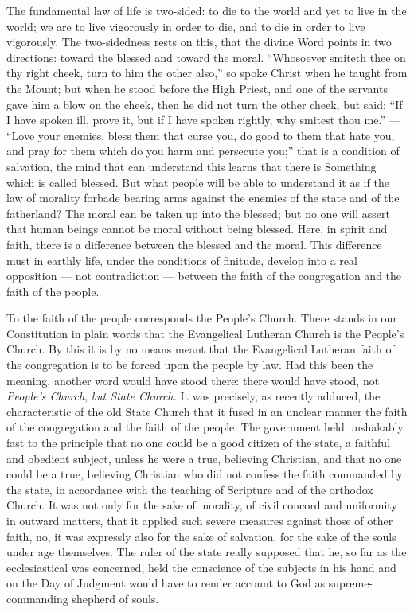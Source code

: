 \documentclass[12pt,a4paper,openany]{book}
\newcommand{\opage}[1]{\marginnote{\footnotesize\textit{[#1]}}}
\begin{document}
The fundamental law of life is two-sided: to die to the world
and yet to live in the world; we are to live vigorously in order to
die, and to die in order to live vigorously. The two-sidedness
rests on this, that the divine Word points in two directions:
toward the blessed and toward the moral. ``Whosoever
smiteth thee on thy right cheek, turn to him the other
also,'' so spoke Christ when he taught from
\setcounter{footnote}{0}%
\opage{105}the Mount; but when he stood before the High Priest, and one
of the servants gave him a blow on the cheek, then he did
not turn the other cheek, but said: ``If I have
spoken ill, prove it, but if I have spoken rightly, why
smitest thou me.'' --- ``Love your enemies, bless
them that curse you, do good to them that
hate you, and pray for them which do you harm and
persecute you;'' that is a condition of salvation, the mind
that can understand this learns that there is Something
which is called blessed. But what people will be able to
understand it as if the law of morality forbade
bearing arms against the enemies of the state and of the fatherland?
The moral can be taken up into the blessed; but no one
will assert that human beings cannot be
moral without being blessed. Here, in spirit and faith,
there is a difference between the blessed and the moral. This
difference must in earthly life, under the conditions
of finitude, develop into a real opposition ---
not contradiction --- between the faith of the congregation and the faith of the people.


To the faith of the people corresponds the People's Church. There stands in
our Constitution in plain words that the Evangelical Lutheran
Church is the People's Church. By this it is by no means meant that
the Evangelical Lutheran faith of the congregation is to be forced upon
the people by law. Had this been the meaning, another
word would have stood there: there would have stood, not \emph{People's Church},
\emph{but State Church.} It was precisely, as recently
adduced, the characteristic of the old State Church
that it fused in an unclear manner the faith of the congregation
and the faith of the people. The government held unshakably fast
to the principle that no one could be a good
citizen of the state, a faithful and obedient subject, unless
\setcounter{footnote}{0}%
\opage{106}he were a true, believing Christian, and that no one could
be a true, believing Christian who did not confess
the faith commanded by the state, in accordance with the teaching of Scripture
and of the orthodox Church. It
was not only for the sake of morality, of civil concord
and uniformity in outward matters, that
it applied such severe measures against those of other faith,
no, it was expressly also for the sake of salvation,
for the sake of the souls under age themselves.
The ruler of the state really supposed that he, so far as
the ecclesiastical was concerned, held the conscience of the subjects in his
hand and on the Day of Judgment would have to render account to God
as supreme-commanding shepherd of souls.
\end{document}
